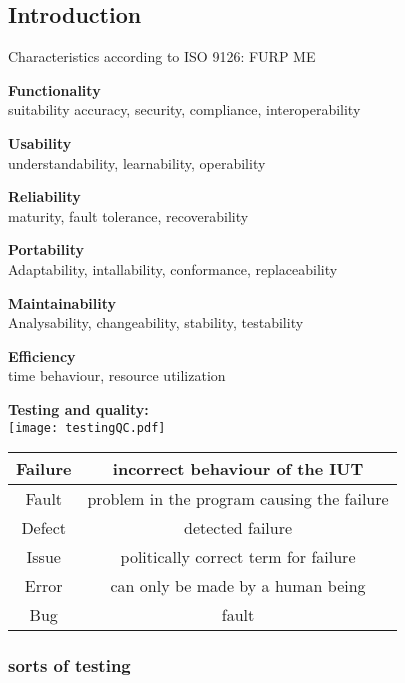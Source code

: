 \subsection{Introduction}
Characteristics according to ISO 9126: FURP ME
\begin{itemize*}
\item \textbf{Functionality}\\
 suitability accuracy, security, compliance, interoperability
\item \textbf{Usability}\\
 understandability, learnability, operability
\item \textbf{Reliability}\\
 maturity, fault tolerance, recoverability
\item \textbf{Portability}\\
 Adaptability, intallability, conformance, replaceability
\item \textbf{Maintainability}\\
 Analysability, changeability, stability, testability
\item \textbf{Efficiency}\\
 time behaviour, resource utilization
\end{itemize*}

\textbf{Testing and quality:}\\
\texttt{[image: testingQC.pdf]}

\begin{tabular}{c|c}
	Failure  & incorrect behaviour of the IUT \\ 
	\hline Fault  & problem in the program causing the failure \\ 
	\hline Defect & detected failure \\ 
	\hline Issue & politically correct term for failure \\ 
	\hline Error & can only be made by a human being  \\ 
	\hline Bug & fault \\ 	
\end{tabular} 

\subsubsection{sorts of testing}

